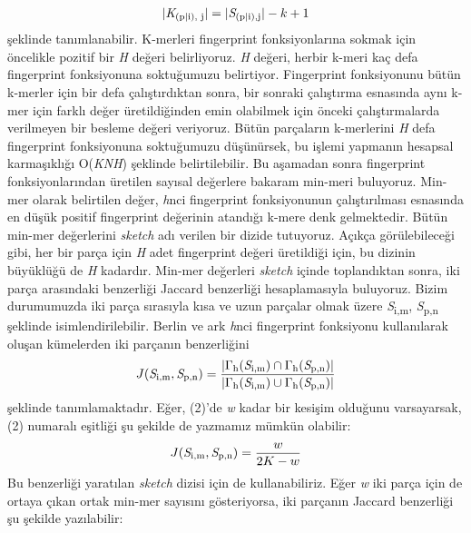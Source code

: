\begin{gather*}
| \textit{K}\textsubscript{(p\textbar i), j} | = |\textit{S}\textsubscript{(p\textbar i),j}| - k + 1
\end{gather*}
şeklinde tanımlanabilir. K-merleri fingerprint fonksiyonlarına sokmak için öncelikle pozitif bir \textit{H} değeri belirliyoruz. \textit{H} değeri, herbir k-meri kaç defa fingerprint fonksiyonuna soktuğumuzu belirtiyor. Fingerprint fonksiyonunu bütün k-merler için bir defa çalıştırdıktan sonra, bir sonraki çalıştırma esnasında aynı k-mer için farklı değer üretildiğinden emin olabilmek için önceki çalıştırmalarda verilmeyen bir besleme değeri veriyoruz. Bütün parçaların k-merlerini \textit{H} defa fingerprint fonksiyonuna soktuğumuzu düşünürsek, bu işlemi yapmanın hesapsal karmaşıklığı O(\textbar\textit{K}\textbar\textit{N}\textit{H}) şeklinde belirtilebilir. Bu aşamadan sonra fingerprint fonksiyonlarından üretilen sayısal değerlere bakaram min-meri buluyoruz. Min-mer olarak belirtilen değer, \textit{h}nci fingerprint fonksiyonunun çalıştırılması esnasında en düşük positif fingerprint değerinin atandığı k-mere denk gelmektedir. Bütün min-mer değerlerini \textit{sketch} adı verilen bir dizide tutuyoruz. Açıkça görülebileceği gibi, her bir parça için \textit{H} adet fingerprint değeri üretildiği için, bu dizinin büyüklüğü de \textit{H} kadardır. Min-mer değerleri \textit{sketch} içinde toplandıktan sonra, iki parça arasındaki benzerliği Jaccard benzerliği \cite{Jaccard1901} hesaplamasıyla buluyoruz. Bizim durumumuzda iki parça sırasıyla kısa ve uzun parçalar olmak üzere \textit{S}\textsubscript{i,m}, \textit{S}\textsubscript{p,n} şeklinde isimlendirilebilir. Berlin ve ark \textit{h}nci fingerprint fonksiyonu kullanılarak oluşan kümelerden iki parçanın benzerliğini
\begin{equation}
J(\textit{S}\textsubscript{i,m}, \textit{S}\textsubscript{p,n}) = \dfrac{|\Gamma \textsubscript{h}(\textit{S}\textsubscript{i,m}) \cap \Gamma \textsubscript{h}(\textit{S}\textsubscript{p,n})|}{|\Gamma \textsubscript{h}(\textit{S}\textsubscript{i,m}) \cup \Gamma \textsubscript{h}(\textit{S}\textsubscript{p,n})|}
\end{equation}
şeklinde tanımlamaktadır. Eğer, (2)'de \textit{w} kadar bir kesişim olduğunu varsayarsak, (2) numaralı eşitliği şu şekilde de yazmamız mümkün olabilir:
\begin{equation}
J(\textit{S}\textsubscript{i,m}, \textit{S}\textsubscript{p,n}) = \dfrac{w}{2K - w}
\end{equation}
Bu benzerliği yaratılan \textit{sketch} dizisi için de kullanabiliriz. Eğer \textit{w} iki parça için de ortaya çıkan ortak min-mer sayısını gösteriyorsa, iki parçanın Jaccard benzerliği şu şekilde yazılabilir:
